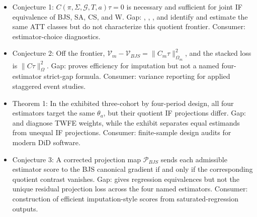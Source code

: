 \documentclass[11pt]{article}
\theoremstyle{definition}
\theoremstyle{plain}
\theoremstyle{remark}
\begin{document}
\begin{itemize}[leftmargin=*]
\item Conjecture 1: \(C(\pi,\Sigma,\mathcal G,T,a)\tau=0\) is necessary and sufficient for joint IF equivalence of BJS, SA, CS, and W. Gap: \citet{borusyak_jaravel_spiess_2024_restud}, \citet{sun_abraham_2021_joe}, \citet{callaway_santanna_2021_joe}, and \citet{wooldridge_2023_ectj} identify and estimate the same ATT classes but do not characterize this quotient frontier. Consumer: \citet{roth_santanna_bilinski_poe_2023_joe} estimator-choice diagnostics.
\item Conjecture 2: Off the frontier, \(\mathcal V_m-\mathcal V_{BJS}=\|C_m\tau\|^2_{\Omega_m}\), and the stacked loss is \(\|C\tau\|^2_{\Omega}\). Gap: \citet{borusyak_jaravel_spiess_2024_restud} proves efficiency for imputation but not a named four-estimator strict-gap formula. Consumer: variance reporting for applied staggered event studies.
\item Theorem 1: In the exhibited three-cohort by four-period design, all four estimators target the same \(\theta_a\), but their quotient IF projections differ. Gap: \citet{dechaisemartin_dhaultfoeuille_2020_aer} and \citet{goodman_bacon_2021_joe} diagnose TWFE weights, while the exhibit separates equal estimands from unequal IF projections. Consumer: finite-sample design audits for modern DiD software.
\item Conjecture 3: A corrected projection map \(\mathcal P_{BJS}\) sends each admissible estimator score to the BJS canonical gradient if and only if the corresponding quotient contrast vanishes. Gap: \citet{wooldridge_2023_ectj} gives regression equivalences but not the unique residual projection loss across the four named estimators. Consumer: construction of efficient imputation-style scores from saturated-regression outputs.
\end{itemize}
\end{document}
